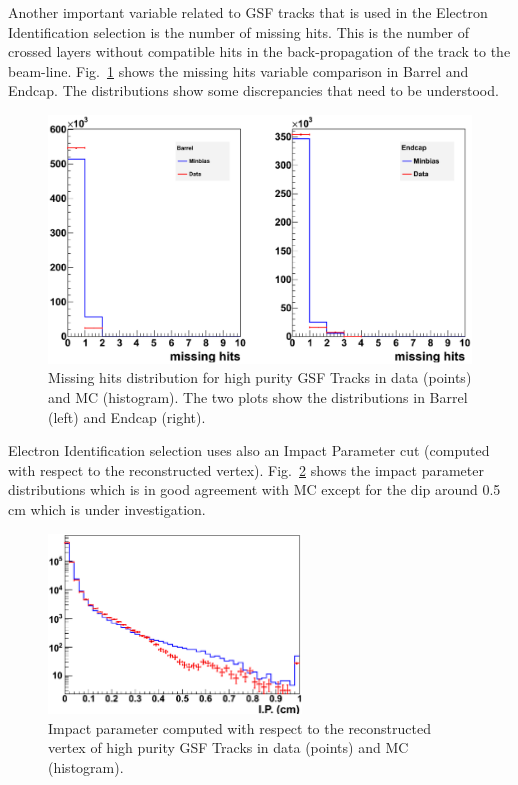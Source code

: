 Another important variable related to GSF tracks that is used in the Electron Identification selection
is the number of missing hits. This is the number of crossed layers without compatible hits
in the back-propagation of the track to the beam-line.
Fig.~\ref{fig:mssinghits} shows the missing hits variable comparison in Barrel and Endcap. The distributions
show some discrepancies that need to be understood.

\begin{figure}
  \begin{center}
    \includegraphics[width=.8\textwidth]{Images/gsf_mishits.eps}
    \caption {Missing hits distribution for high purity GSF Tracks in data (points) and MC (histogram). The two plots show the distributions in Barrel (left) and Endcap (right).}
    \label{fig:mssinghits}
  \end{center}
\end{figure}

Electron Identification selection uses also an Impact Parameter cut (computed with respect to the 
reconstructed vertex).
Fig.~\ref{fig:ip} shows the impact parameter distributions which is in good agreement with MC except
for the dip around 0.5 cm which is under investigation.

\begin{figure}
  \begin{center}
    \includegraphics[width=0.6\textwidth]{Images/gsf_ip.eps}
    \caption {Impact parameter computed with respect to the reconstructed vertex of high purity GSF Tracks in data (points) and MC (histogram).}
    \label{fig:ip}
  \end{center}
\end{figure}

